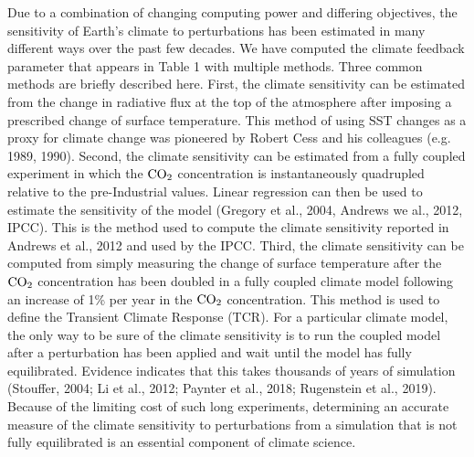 \documentclass[draft]{agujournal2019}
\begin{document}
Due to a combination of changing computing power and differing objectives, the sensitivity of Earth's climate to 
perturbations has been estimated in many different ways over the past few decades.  
We have computed the climate feedback parameter that appears in Table 1 with multiple methods.  
Three common methods are briefly described here.  
First, the climate sensitivity can be estimated from the change in radiative flux at the top of the 
atmosphere after imposing a prescribed change of surface temperature.  This method of using SST changes
as a proxy for climate change was pioneered by Robert Cess and his colleagues (e.g. 1989, 1990).  
Second, the climate
sensitivity can be estimated from a fully coupled experiment in which the $\rm{CO}_{2}$ concentration is 
instantaneously quadrupled relative to the pre-Industrial values.  Linear regression can then be used to 
estimate the sensitivity of the model (Gregory et al., 2004, Andrews we al., 2012, IPCC).  
This is the method used to compute the climate sensitivity reported in Andrews et al., 2012 
and used by the IPCC.  Third, the climate sensitivity
can be computed from simply measuring the change of surface temperature after the $\rm{CO}_{2}$ concentration
has been doubled in a fully coupled climate model following an increase of 1\% per year in the 
$\rm{CO}_{2}$ concentration.   This method is used to define the Transient Climate Response (TCR).
For a particular climate model, the only way to be sure of the climate sensitivity is to run the 
coupled model after a perturbation has been applied and wait until the model has fully 
equilibrated.  Evidence indicates that this takes thousands of years of 
simulation (Stouffer, 2004; Li et al., 2012; Paynter et al., 2018; Rugenstein et al., 2019).
Because of the limiting cost of such long experiments, determining an accurate measure 
of the climate sensitivity to perturbations from a simulation that is not fully equilibrated is an 
essential component of climate science.  
    
\end{document}
